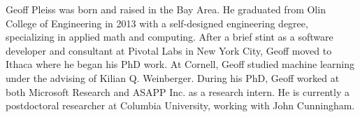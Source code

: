 Geoff Pleiss was born and raised in the Bay Area.
He graduated from Olin College of Engineering in 2013 with a self-designed engineering degree, specializing in applied math and computing.
After a brief stint as a software developer and consultant at Pivotal Labs in New York City, Geoff moved to Ithaca where he began his PhD work.
At Cornell, Geoff studied machine learning under the advising of Kilian Q. Weinberger.
During his PhD, Geoff worked at both Microsoft Research and ASAPP Inc. as a research intern.
He is currently a postdoctoral researcher at Columbia University, working with John Cunningham.

